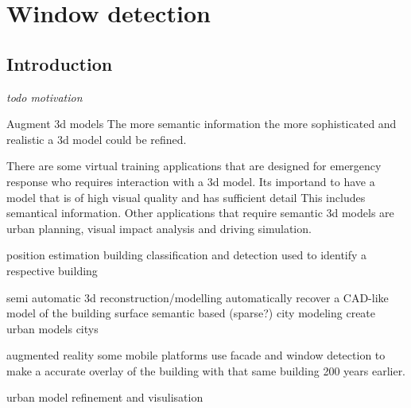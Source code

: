 





%
%




\section{Window detection}


\label{chap:windowDetection}
\subsection{Introduction}
\emph{ todo motivation}


Augment 3d models
	The more semantic information 
	the more sophisticated and realistic a 3d model could be refined.

	There are some virtual training applications that are designed for emergency response who requires interaction with a 3d model.
	Its importand to have a model that is of high visual quality and has sufficient detail 
	This includes semantical information.
	Other applications that require semantic 3d models are urban planning, visual impact analysis and driving simulation.

position estimation
	building classification and detection
	used to identify a respective building


semi automatic 3d reconstruction/modelling
	automatically recover a CAD-like model of the building surface
	semantic based (sparse?) city modeling
	create urban models
	citys

augmented reality
	some mobile platforms use facade and window detection to make a accurate
	overlay of the building with that same building 200 years earlier.


urban model refinement and visulisation

